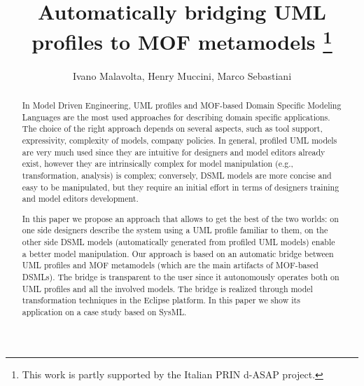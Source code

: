 \documentclass[orivec]{llncs}
\begin{document}
\title{{Automatically bridging UML profiles to MOF metamodels}
\thanks{This work is partly supported by the Italian PRIN d-ASAP project.}}


\author{Ivano Malavolta, Henry Muccini, Marco Sebastiani}

\maketitle

\begin{abstract}
In Model Driven Engineering, UML profiles and MOF-based Domain Specific Modeling Languages are the most used approaches for describing domain specific applications.  
The choice of the right approach depends on several aspects, such as tool support, expressivity, complexity of models, company policies. In general, profiled UML models are very much used since they are intuitive for designers and model editors already exist, however they are intrinsically complex for model manipulation (e.g., transformation, analysis) is complex; conversely, DSML models are more concise and easy to be manipulated, but they require an initial effort in terms of designers training and model editors development. 

In this paper we propose an approach that allows to get the best of the two worlds: 
on one side designers describe the system using a UML profile familiar to them, on the other side DSML models (automatically generated from profiled UML models) enable a better model manipulation. Our approach is based on an automatic bridge between UML profiles and MOF metamodels (which are the main artifacts of MOF-based DSMLs). The bridge is transparent to the user since it autonomously operates both on UML profiles 
and all the involved models. The bridge is realized through model transformation techniques in the Eclipse platform. In this paper we show its application on a case study based on SysML.



\end{abstract}
\end{document}
